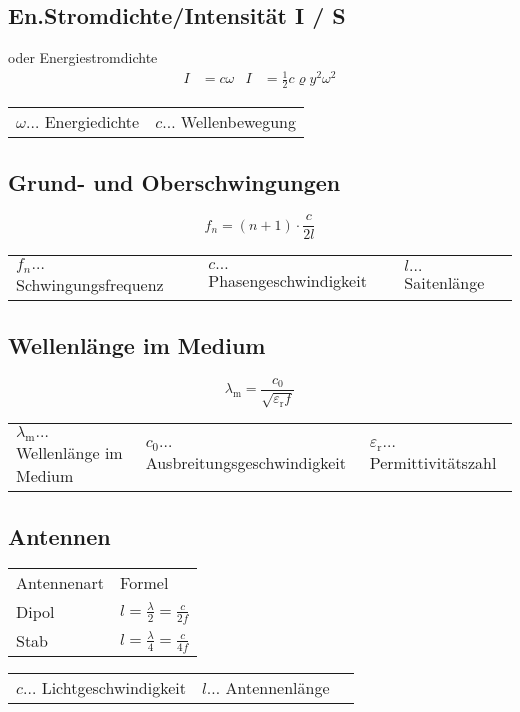 		\subsection{En.Stromdichte/Intensität I / S}
			oder Energiestromdichte
			\begin{align*}
				I &= c \omega	& I &= \frac12 c \varrho y^2 \omega^2 
			\end{align*} 

			\begin{table}[h]
			\begin{tabular}{ll}
			$\omega \dots$ Energiedichte & $c \dots$ Wellenbewegung\\
			\end{tabular}
			\end{table}

		\subsection{Grund- und Oberschwingungen}
			\[
				f_n=(n+1)\cdot\frac{c}{2l}
			\]
			\begin{table}[h]
			\begin{tabular}{lll}
				$f_n\dots$ Schwingungsfrequenz & $c\dots$ Phasengeschwindigkeit & $l\dots$ Saitenlänge\\
			\end{tabular}
			\end{table}
		
		\subsection{Wellenlänge im Medium}
			\[
				\lambda_{\mathrm{m}}=\frac{c_0}{\sqrt{\varepsilon_{\mathrm{r}}f}}
			\]
			
			\begin{table}[h]
			\begin{tabular}{lll}
				$\lambda_{\mathrm{m}}\dots$ Wellenlänge im Medium 
				& $c_0\dots$ Ausbreitungsgeschwindigkeit 
				& $\varepsilon_{\mathrm{r}}\dots$ Permittivitätszahl\\
			\end{tabular}
			\end{table}

		\subsection{Antennen}
			\begin{table}[h]
			\begin{tabular}{ll}
				Antennenart & Formel\\
				Dipol & $l=\frac{\lambda}{2}=\frac{c}{2f}$\\
				Stab & $l=\frac{\lambda}{4}=\frac{c}{4f}$\\
			\end{tabular}
			\end{table}
			\begin{table}[h]
			\begin{tabular}{lll}
				$c\dots$ Lichtgeschwindigkeit & $l\dots$ Antennenlänge\\
			\end{tabular}
			\end{table}
